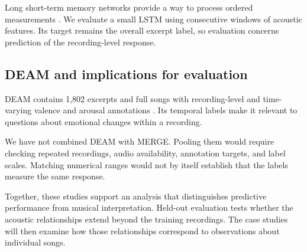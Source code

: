 Long short-term memory networks provide a way to process ordered measurements \cite{hochreiter1997lstm}. We evaluate a small LSTM using consecutive windows of acoustic features. Its target remains the overall excerpt label, so evaluation concerns prediction of the recording-level response.

\subsection{DEAM and implications for evaluation}

DEAM contains 1,802 excerpts and full songs with recording-level and time-varying valence and arousal annotations \cite{deamdataset}. Its temporal labels make it relevant to questions about emotional changes within a recording.

We have not combined DEAM with MERGE. Pooling them would require checking repeated recordings, audio availability, annotation targets, and label scales. Matching numerical ranges would not by itself establish that the labels measure the same response.

Together, these studies support an analysis that distinguishes predictive performance from musical interpretation. Held-out evaluation tests whether the acoustic relationships extend beyond the training recordings. The case studies will then examine how those relationships correspond to observations about individual songs.
